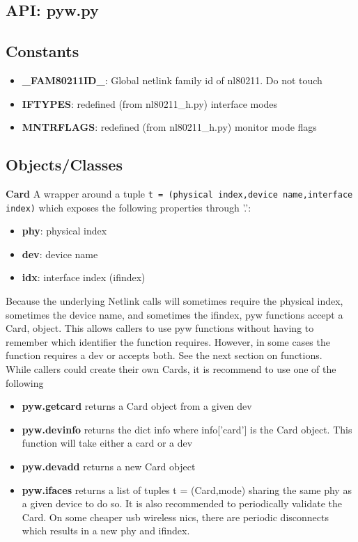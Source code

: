 \documentclass[11pt]{article}
\begin{document}
\begin{appendices}
\section{API: pyw.py}\label{sec:pywapi}

\subsection{Constants}
\begin{itemize}
\item \textbf{\_FAM80211ID\_}: Global netlink family id of nl80211. Do not touch
\item \textbf{IFTYPES}: redefined (from nl80211\_h.py) interface modes
\item \textbf{MNTRFLAGS}: redefined (from nl80211\_h.py) monitor mode flags
\end{itemize}

\subsection{Objects/Classes}
\textbf{Card} A wrapper around a tuple 
\texttt{t = (physical index,device name,interface index)}
which exposes the following properties through '.':
\begin{itemize}
\item \textbf{phy}: physical index
\item \textbf{dev}: device name
\item \textbf{idx}: interface index (ifindex)
\end{itemize}
Because the underlying Netlink calls will sometimes require the physical index,
sometimes the device name, and sometimes the ifindex, pyw functions accept a Card,
object. This allows callers to use pyw functions without having to remember which 
identifier the function requires. However, in some cases the function requires 
a dev or accepts both. See the next section on functions.\\

While callers could create their own Cards, it is recommend to use one of the 
following
\begin{itemize}
\item \textbf{pyw.getcard} returns a Card object from a given dev
\item \textbf{pyw.devinfo} returns the dict info where info['card'] is the Card 
object. This function will take either a card or a dev
\item \textbf{pyw.devadd} returns a new Card object
\item \textbf{pyw.ifaces} returns a list of tuples t = (Card,mode) sharing the 
same phy as a given device to do so. It is also recommended to periodically 
validate the Card. On some cheaper usb wireless nics, there are periodic 
disconnects which results in a new phy and ifindex.
\end{itemize}


\end{appendices}
\end{document}
